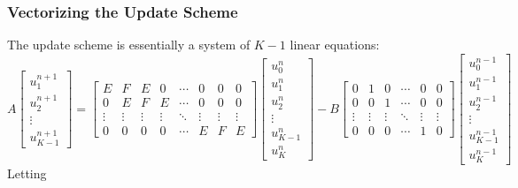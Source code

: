 \documentclass{article}
\begin{document}
\subsubsection{Vectorizing the Update Scheme}
\label{subsubsec: Vectorizing the Update Scheme}

The update scheme  is essentially a system of $K-1$ linear equations:
\begin{equation*}
   A
   \begin{bmatrix}
      u_{1}^{n+1} \\
      u_{2}^{n+1} \\
      \vdots \\
      u_{K-1}^{n+1}
   \end{bmatrix}
   =
   \begin{bmatrix}
      E & F & E & 0 & \cdots & 0 & 0 & 0 \\
      0 & E & F & E & \cdots & 0 & 0 & 0 \\
      \vdots & \vdots & \vdots & \vdots & \ddots & \vdots & \vdots & \vdots \\
      0 & 0 & 0 & 0 & \cdots & E & F & E
   \end{bmatrix}
   \begin{bmatrix}
      u_{0}^{n} \\
      u_{1}^{n} \\
      u_{2}^{n} \\
      \vdots \\
      u_{K-1}^{n} \\
      u_{K}^{n}
   \end{bmatrix}
   - B
   \begin{bmatrix}
      0 & 1 & 0 & \cdots & 0 & 0 \\
      0 & 0 & 1 & \cdots & 0 & 0 \\
      \vdots & \vdots & \vdots & \ddots & \vdots & \vdots \\
      0 & 0 & 0 & \cdots & 1 & 0
   \end{bmatrix}
   \begin{bmatrix}
      u_{0}^{n-1} \\
      u_{1}^{n-1} \\
      u_{2}^{n-1} \\
      \vdots \\
      u_{K-1}^{n-1} \\
      u_{K}^{n-1}
   \end{bmatrix}
\end{equation*}
Letting
\end{document}
